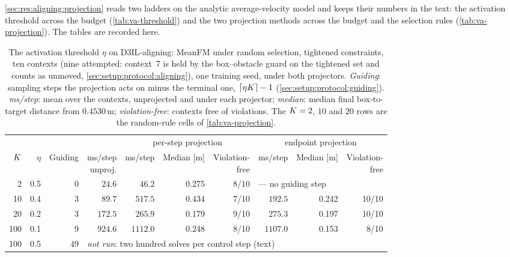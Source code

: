 \autoref{sec:res:aligning:projection} reads two ladders on the analytic average-velocity model and keeps their
numbers in the text: the activation threshold across the budget (\autoref{tab:va-threshold}) and the two
projection methods across the budget and the selection rules (\autoref{tab:va-projection}). The tables are
recorded here.

\begin{table}[htpb]
  \caption[Alignment: the activation threshold across the budget ladder]{The activation threshold
  $\eta$ on D3IL-aligning: MeanFM under random selection, tightened constraints, ten contexts (nine attempted:
  context~7 is held by the box--obstacle guard on the tightened set and counts as unmoved,
  \autoref{sec:setup:protocol:aligning}), one training seed, under both projectors. \emph{Guiding}: sampling steps the projection acts on minus the
  terminal one, $\lceil \eta K \rceil - 1$ (\autoref{sec:setup:protocol:guiding}). \emph{ms/step}:
  mean over the contexts, unprojected and under each projector;
  \emph{median}: median final box-to-target distance from $0.4530$\,m; \emph{violation-free}: contexts free of
  violations. The $K=2$, $10$ and $20$ rows are the random-rule cells of \autoref{tab:va-projection}.}
  \label{tab:va-threshold}
  \centering
  \footnotesize
  \setlength{\tabcolsep}{3pt}
  \begin{tabularx}{\linewidth}{@{}r r r r rrr rrr@{}}
    \toprule
    & & & & \multicolumn{3}{c}{per-step projection} & \multicolumn{3}{c}{endpoint projection} \\
    \cmidrule(lr){5-7}\cmidrule(l){8-10}
    $K$ & $\eta$ & Guiding & \shortstack{ms/step\\unproj.} & ms/step & Median [m] & \shortstack{Violation-\\free} & ms/step & Median [m] & \shortstack{Violation-\\free} \\
    \midrule
    2   & 0.5 & 0  & $24.6$  & $46.2$  & 0.275 & 8/10  & \multicolumn{3}{l}{--- no guiding step} \\
    10  & 0.4 & 3  & $89.7$  & $517.5$ & 0.434 & 7/10  & $192.5$ & 0.242 & 10/10 \\
    20  & 0.2 & 3  & $172.5$ & $265.9$ & 0.179 & 9/10  & $275.3$ & 0.197 & 10/10 \\
    100 & 0.1 & 9  & $924.6$ & $1112.0$ & 0.248 & 8/10 & $1107.0$ & 0.153 & 8/10 \\
    100 & 0.5 & 49 & \multicolumn{7}{l}{\emph{not run}: two hundred solves per control step (text)} \\
    \bottomrule
  \end{tabularx}
\end{table}

